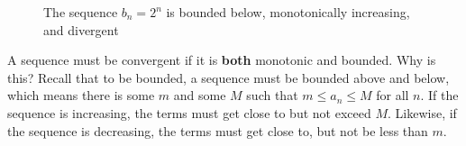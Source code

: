 \begin{figure}
    \centering
    \caption{The sequence $b_n = 2^n$ is bounded below, monotonically
        increasing, and divergent}
    \label{fig:divexp}
\end{figure}

A sequence must be convergent if it is \textbf{both} monotonic and bounded.
Why is this? Recall that to be bounded, a sequence must be bounded above and
below, which means there is some $m$ and some $M$ such that $m \leq a_n \leq M$
for all $n$. If the sequence is increasing, the terms must get close to but not
exceed $M$. Likewise, if the sequence is decreasing, the terms must get close
to, but not be less than $m$.

